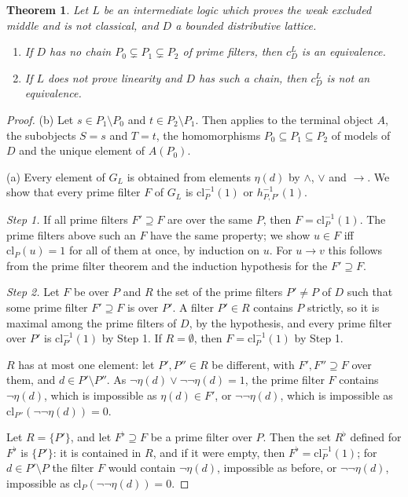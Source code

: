 \documentclass[11pt]{amsart}
\newtheorem{thm}{Theorem}[section]
\theoremstyle{definition}
\begin{document}
\begin{thm}\label{thm:propositional}
Let $L$ be an intermediate logic which proves the weak excluded middle
and is not classical, and $D$ a bounded distributive lattice.
\begin{enumerate}
\item[(a)] If $D$ has no chain $P_0\subsetneq P_1\subsetneq P_2$ of
prime filters, then $c^L_D$ is an equivalence.
\item[(b)] If $L$ does not prove linearity and $D$ has such a chain,
then $c^L_D$ is not an equivalence.
\end{enumerate}
\end{thm}
\begin{proof}
(b) Let $s\in P_1\setminus P_0$ and $t\in P_2\setminus P_1$. Then
\cite[Prop.~5.1]{Interm} applies to the terminal object $A$, the
subobjects $S=s$ and $T=t$, the homomorphisms $P_0\subseteq P_1\subseteq
P_2$ of models of $D$ and the unique element of $A(P_0)$.

(a) Every element of $G_L$ is obtained from elements $\eta(d)$ by
$\wedge$, $\vee$ and $\to$. We show that every prime filter $F$ of
$G_L$ is $\mathrm{cl}_P^{-1}(1)$ or $h_{P,P'}^{-1}(1)$.

\emph{Step 1.} If all prime filters $F'\supseteq F$ are over the same
$P$, then $F=\mathrm{cl}_P^{-1}(1)$. The prime filters above such an
$F$ have the same property; we show $u\in F$ iff $\mathrm{cl}_P(u)=1$
for all of them at once, by induction on $u$. For $u\to v$ this
follows from the prime filter theorem and the induction hypothesis for
the $F'\supseteq F$.

\emph{Step 2.} Let $F$ be over $P$ and $R$ the set of the prime filters
$P'\ne P$ of $D$ such that some prime filter $F'\supseteq F$ is over
$P'$. A filter $P'\in R$ contains $P$ strictly, so it is maximal among
the prime filters of $D$, by the hypothesis, and every prime filter
over $P'$ is $\mathrm{cl}_{P'}^{-1}(1)$ by Step 1. If $R=\emptyset$,
then $F=\mathrm{cl}_P^{-1}(1)$ by Step 1.

$R$ has at most one element: let $P',P''\in R$ be different, with
$F',F''\supseteq F$ over them, and $d\in P'\setminus P''$. As
$\neg\eta(d)\vee\neg\neg\eta(d)=1$, the prime filter $F$ contains
$\neg\eta(d)$, which is impossible as $\eta(d)\in F'$, or
$\neg\neg\eta(d)$, which is impossible as $\mathrm{cl}_{P''}(\neg\neg
\eta(d))=0$.

Let $R=\{P'\}$, and let $F^\flat\supseteq F$ be a prime filter over
$P$. Then the set $R^\flat$ defined for $F^\flat$ is $\{P'\}$: it is
contained in $R$, and if it were empty, then $F^\flat=\mathrm{cl}_P^{-1}
(1)$; for $d\in P'\setminus P$ the filter $F$ would contain $\neg\eta
(d)$, impossible as before, or $\neg\neg\eta(d)$, impossible as
$\mathrm{cl}_P(\neg\neg\eta(d))=0$.


\end{proof}
\end{document}
